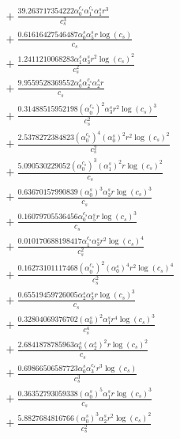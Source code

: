 \documentclass[10pt]{article}
\begin{document}
\begin{align*}
&{}  + \frac{39.263717354222 \alpha_{0}^{c_s} \alpha_{1}^{c_s} \alpha_{1}^s r^{3}}{c_{s}^{3}} \\
&{}  + \frac{0.61616427546487 \alpha_{0}^s \alpha_{5}^s r \log{\left(c_{s} \right)}}{c_{s}} \\
&{}  + \frac{1.2411210068283 \alpha_{1}^s \alpha_{3}^s r^{2} \log{\left(c_{s} \right)}^{2}}{c_{s}^{2}} \\
&{}  + \frac{9.9559528369552 \alpha_{0}^s \alpha_{2}^{c_s} \alpha_{2}^s r}{c_{s}} \\
&{}  + \frac{0.31488515952198 \left(\alpha_{0}^{c_s}\right)^{2} \alpha_{3}^s r^{2} \log{\left(c_{s} \right)}^{3}}{c_{s}^{2}} \\
&{}  + \frac{2.5378272384823 \left(\alpha_{0}^{c_s}\right)^{4} \left(\alpha_{0}^s\right)^{2} r^{2} \log{\left(c_{s} \right)}^{2}}{c_{s}^{2}} \\
&{}  + \frac{5.090530229052 \left(\alpha_{0}^{c_s}\right)^{3} \left(\alpha_{1}^s\right)^{2} r \log{\left(c_{s} \right)}^{2}}{c_{s}} \\
&{}  + \frac{0.63670157990839 \left(\alpha_{0}^s\right)^{3} \alpha_{3}^s r \log{\left(c_{s} \right)}^{3}}{c_{s}} \\
&{}  + \frac{0.16079705536456 \alpha_{0}^{c_s} \alpha_{5}^s r \log{\left(c_{s} \right)}^{3}}{c_{s}} \\
&{}  + \frac{0.010170688198417 \alpha_{1}^{c_s} \alpha_{3}^s r^{2} \log{\left(c_{s} \right)}^{4}}{c_{s}^{2}} \\
&{}  + \frac{0.16273101117468 \left(\alpha_{0}^{c_s}\right)^{2} \left(\alpha_{0}^s\right)^{4} r^{2} \log{\left(c_{s} \right)}^{4}}{c_{s}^{2}} \\
&{}  + \frac{0.65519459726005 \alpha_{2}^s \alpha_{3}^s r \log{\left(c_{s} \right)}^{3}}{c_{s}} \\
&{}  + \frac{0.32804069376702 \left(\alpha_{0}^s\right)^{2} \alpha_{1}^s r^{4} \log{\left(c_{s} \right)}^{3}}{c_{s}^{4}} \\
&{}  + \frac{2.6841878785963 \alpha_{0}^s \left(\alpha_{2}^s\right)^{2} r \log{\left(c_{s} \right)}^{2}}{c_{s}} \\
&{}  + \frac{0.69866506587723 \alpha_{0}^s \alpha_{3}^{c_s} r^{3} \log{\left(c_{s} \right)}}{c_{s}^{3}} \\
&{}  + \frac{0.36352793059338 \left(\alpha_{0}^s\right)^{5} \alpha_{1}^s r \log{\left(c_{s} \right)}^{3}}{c_{s}} \\
&{}  + \frac{5.8827684816766 \left(\alpha_{0}^s\right)^{3} \alpha_{2}^s r^{2} \log{\left(c_{s} \right)}^{2}}{c_{s}^{2}} \\

\end{align*}
\end{document}
